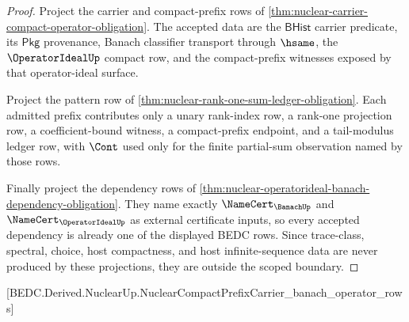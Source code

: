 \begin{proof}
Project the carrier and compact-prefix rows of \autoref{thm:nuclear-carrier-compact-operator-obligation}. The accepted data are the $\mathsf{BHist}$ carrier predicate, its $\mathsf{Pkg}$ provenance, Banach classifier transport through $\hsame$, the $\OperatorIdealUp$ compact row, and the compact-prefix witnesses exposed by that operator-ideal surface.

Project the pattern row of \autoref{thm:nuclear-rank-one-sum-ledger-obligation}. Each admitted prefix contributes only a unary rank-index row, a rank-one projection row, a coefficient-bound witness, a compact-prefix endpoint, and a tail-modulus ledger row, with $\Cont$ used only for the finite partial-sum observation named by those rows.

Finally project the dependency rows of \autoref{thm:nuclear-operatorideal-banach-dependency-obligation}. They name exactly $\NameCert_{\BanachUp}$ and $\NameCert_{\OperatorIdealUp}$ as external certificate inputs, so every accepted dependency is already one of the displayed BEDC rows. Since trace-class, spectral, choice, host compactness, and host infinite-sequence data are never produced by these projections, they are outside the scoped boundary.
\end{proof}

[BEDC.Derived.NuclearUp.NuclearCompactPrefixCarrier\_banach\_operator\_rows]

